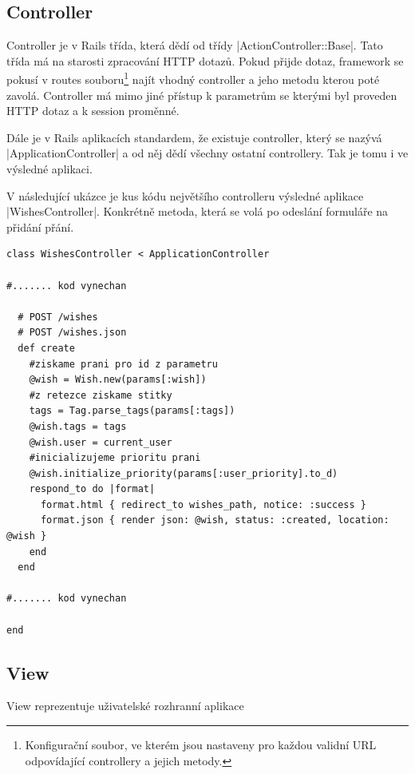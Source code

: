 \subsection{Controller}
Controller je v Rails třída, která dědí od třídy |ActionController::Base|. Tato třída má na starosti zpracování HTTP dotazů. Pokud přijde dotaz, framework se pokusí v routes souboru\footnote{Konfigurační soubor, ve kterém jsou nastaveny pro každou validní URL odpovídající controllery a jejich metody.} najít vhodný controller a jeho metodu kterou poté zavolá. Controller má mimo jiné přístup k parametrům se kterými byl proveden HTTP dotaz a k session proměnné.

Dále je v Rails aplikacích standardem, že existuje controller, který se nazývá |ApplicationController| a od něj dědí všechny ostatní controllery. Tak je tomu i ve výsledné aplikaci.

V následující ukázce je kus kódu největšího controlleru výsledné aplikace |WishesController|. Konkrétně metoda, která se volá po odeslání formuláře na přidání přání.

\lstset{language = ruby, style=custom}
\begin{lstlisting}
class WishesController < ApplicationController

#....... kod vynechan

  # POST /wishes
  # POST /wishes.json
  def create
    #ziskame prani pro id z parametru
    @wish = Wish.new(params[:wish])
    #z retezce ziskame stitky
    tags = Tag.parse_tags(params[:tags])
    @wish.tags = tags
    @wish.user = current_user
    #inicializujeme prioritu prani
    @wish.initialize_priority(params[:user_priority].to_d)
    respond_to do |format|
      format.html { redirect_to wishes_path, notice: :success }
      format.json { render json: @wish, status: :created, location: @wish }
    end
  end

#....... kod vynechan

end
\end{lstlisting}

\subsection{View}
View reprezentuje uživatelské rozhranní aplikace